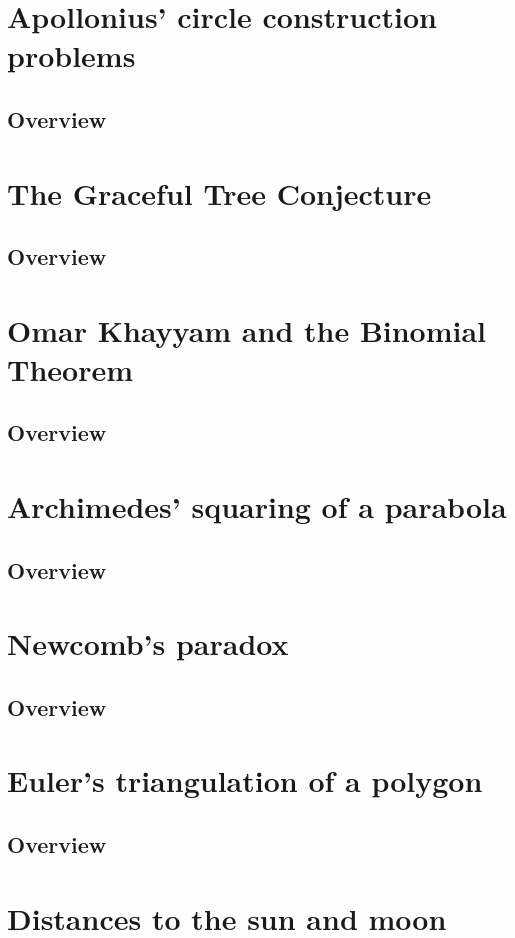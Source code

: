 \documentclass{article}
\begin{document}
\section{Apollonius' circle construction problems}
\subsection{Overview}%
\label{sub:Overview}
\section{The Graceful Tree Conjecture}
\subsection{Overview}%
\label{sub:Overview}
\section{Omar Khayyam and the Binomial Theorem}
\subsection{Overview}%
\label{sub:Overview}
\section{Archimedes' squaring of a parabola}
\subsection{Overview}%
\label{sub:Overview}
\section{Newcomb's paradox}
\subsection{Overview}%
\label{sub:Overview}
\section{Euler's triangulation of a polygon}
\subsection{Overview}%
\label{sub:Overview}
\section{Distances to the sun and moon}
\end{document}
